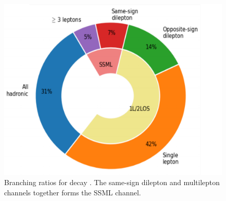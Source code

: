 \documentclass[../thesis.tex]{subfiles}
\begin{document}
\begin{figure}[!htb]
\begin{center}
\includegraphics[width=0.7\linewidth]{fig/theory_tttt_channels.png}
\caption[Branching ratios for \tttt decay. The same-sign dilepton and multilepton channels together forms the SSML channel.]{\label{fig:theory:tttt_channels}Branching ratios for \tttt decay \citep{Sabatini:2784150}. The same-sign dilepton and multilepton channels together forms the \acs{SSML} channel.}
\end{center}
\end{figure}




\end{document}
